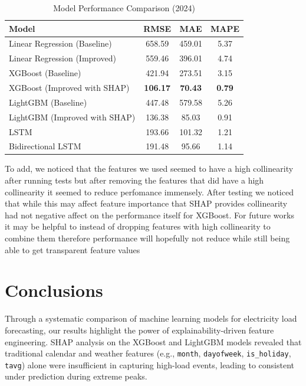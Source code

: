 \documentclass[final,numbered]{ifacconf}
\begin{document}
\begin{table}[h!]
\centering
\caption{Model Performance Comparison (2024)}
\label{tab:model_performance}
\begin{tabular}{lccc}
\toprule
\textbf{Model} & \textbf{RMSE} & \textbf{MAE} & \textbf{MAPE } \\
\midrule
Linear Regression (Baseline)       & 658.59 & 459.01 & 5.37 \\
Linear Regression (Improved)       & 559.46 & 396.01 & 4.74 \\
XGBoost (Baseline)                 & 421.94 & 273.51 & 3.15 \\
XGBoost (Improved with SHAP)       & \textbf{106.17} & \textbf{70.43} & \textbf{0.79} \\
LightGBM (Baseline)                & 447.48 & 579.58 & 5.26 \\
LightGBM (Improved with SHAP)      & 136.38 & 85.03  & 0.91 \\
LSTM                               & 193.66 & 101.32 & 1.21 \\
Bidirectional LSTM                 & 191.48 & 95.66  & 1.14 \\
\bottomrule
\end{tabular}
\end{table}



To add, we noticed that the features we used seemed to have a high collinearity after running tests but after removing the features that did have a high collinearity it seemed to reduce perfomance immensely. After testing we noticed that while this may affect feature importance that SHAP provides collinearity had not negative affect on the performance itself for XGBoost. For future works it may be helpful to instead of dropping features with high collinearity to combine them therefore performance will hopefully not reduce while still being able to get transparent feature values
\section{Conclusions}
Through a systematic comparison of machine learning models for electricity load forecasting, our results highlight the power of explainability-driven feature engineering. SHAP analysis on the XGBoost and LightGBM models revealed that traditional calendar and weather features (e.g., \texttt{month}, \texttt{dayofweek}, \texttt{is_holiday}, \texttt{tavg}) alone were insufficient in capturing high-load events, leading to consistent under prediction during extreme peaks.
\end{document}
